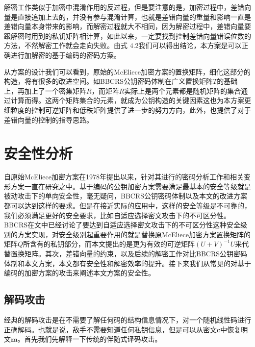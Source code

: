 解密工作类似于加密中混淆作用的反过程，但是要注意的是，加密过程中，差错向量是直接追加上去的，并没有参与混淆计算，也就是差错向量的重量和影响一直是差错向量本身带来的影响，而解密过程就大不相同，因为解密过程中，差错向量要跟解密时用到的私钥矩阵相计算，如此以来，一定要找到控制差错向量错误位数的方法，不然解密工作就会走向失败。由式 4.2我们可以得出结论，本方案是可以正确进行加解密的基于编码的密码方案。

从方案的设计我们可以看到，原始的McEliece加密方案的置换矩阵，细化这部分的构造，将有很多的改进空间。如BBCRS公钥密码体制在广义置换矩阵$T$的基础上，再加上了一个密集矩阵$R$，而矩阵$R$实际上是两个元素都是随机矩阵的集合通过计算而得。这两个矩阵集合的元素，就成为公钥构造的关键因素这也为本方案更细粒度的控制可逆矩阵和低秩矩阵提供了进一步的努力方向，此外，也提供了对于差错向量的控制的指导思路。

\section{安全性分析}
自原始McEliece加密方案在1978年提出以来，针对其进行的密码分析工作和相关变形方案一直在研究之中。基于编码的公钥加密方案需要满足最基本的安全等级就是被动攻击下的单向安全性，毫无疑问，BBCRS公钥密码体制以及本文的改进方案都可以达到这样的要求。但是在接近实际的应用中，这样的安全等级是不可靠的，我们必须满足更好的安全要求，比如自适应选择密文攻击下的不可区分性。BBCRS在文中已经讨论了要达到自适应选择密文攻击下的不可区分性这种安全级别的方案实现，对安全级别起重要作用的就是替换原McEliece加密方案置换矩阵的矩阵$Q$所含有的私钥部分，而本文提出的是更为有效的可逆矩阵$(U + V) ^ {-1}U$来代替置换矩阵。其次，差错向量的约束，以及后续的解密工作对比BBCRS公钥密码体制和本文方案，本文都有安全性和解密效率的提升。接下来我们从常见的对基于编码的加密方案的攻击来阐述本文方案的安全性。

\subsection{解码攻击}
经典的解码攻击是在不需要了解任何码的结构信息情况下，对一个随机线性码进行正确解码。也就是说，敌手不需要知道任何私钥信息，但是可以从密文$\mathbf{c}$中恢复明文$\mathbf{m}$。首先我们先解释一下传统的伴随式译码攻击。

